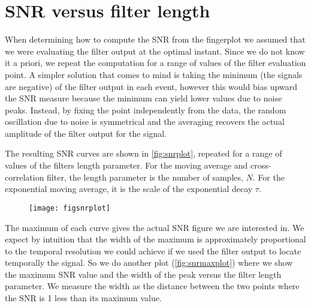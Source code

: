 
\section{SNR versus filter length}

When determining how to compute the SNR from the fingerplot we assumed that we
were evaluating the filter output at the optimal instant. Since we do not know
it a priori, we repeat the computation for a range of values of the filter
evaluation point. A simpler solution that comes to mind is taking the minimum
(the signals are negative) of the filter output in each event, however this
would bias upward the SNR measure because the minimum can yield lower values
due to noise peaks. Instead, by fixing the point independently from the data,
the random oscillation due to noise is symmetrical and the averaging recovers
the actual amplitude of the filter output for the signal.

The resulting SNR curves are shown in \autoref{fig:snrplot}, repeated for a
range of values of the filters length parameter. For the moving average and
cross-correlation filter, the length parameter is the number of samples, $N$.
For the exponential moving average, it is the scale of the exponential decay
$\tau$.

\begin{figure}
    \hspace{-0.26\textwidth}
    \texttt{[image: figsnrplot]}
    

\end{figure}

The maximum of each curve gives the actual SNR figure we are interested in. We
expect by intuition that the width of the maximum is approximately proportional
to the temporal resolution we could achieve if we used the filter output to
locate temporally the signal. So we do another plot
(\autoref{fig:snrmaxplot}) where we show the maximum SNR value and the width
of the peak versus the filter length parameter. We measure the width as the
distance between the two points where the SNR is 1 less than its maximum value.


